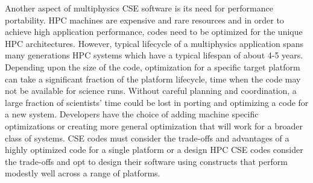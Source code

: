 Another aspect of multiphysics CSE software is its need for
performance portability. HPC machines are expensive and rare resources and in order to achieve high application performance, codes need to be optimized for the unique HPC architectures.
 However, typical lifecycle of a
multiphysics application spans many generations HPC systems which have a typical lifespan of about 4-5 years.  Depending upon the size of the
code, optimization for a specific target platform can take a
significant fraction of the platform lifecycle, time when the code may not be available for science runs.  Without careful planning and coordination,  a
large fraction of scientists' time could be lost in porting and optimizing
a code for a new system.  Developers have the choice of adding machine specific optimizations or creating more general optimization that will work for a broader class of systems.  CSE codes must consider the trade-offs and advantages of a highly optimized code for a single platform or a design 
HPC CSE codes consider the trade-offs and opt to design their software
using constructs that perform modestly well across a range of
platforms. 




